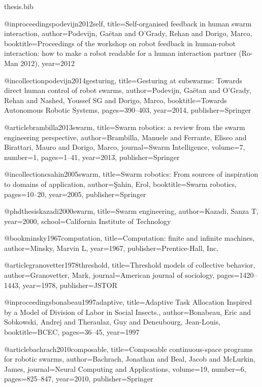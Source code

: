 \documentclass[oneside, a4paper, 12pt]{memoir}
\begin{document}
\begin{filecontents}{thesis.bib}

@inproceedings{podevijn2012self,
  title={Self-organised feedback in human swarm interaction},
  author={Podevijn, Ga{\"e}tan and O’Grady, Rehan and Dorigo, Marco},
  booktitle={Proceedings of the workshop on robot feedback in human-robot interaction: how to make a robot readable for a human interaction partner (Ro-Man 2012)},
  year={2012}
}

@incollection{podevijn2014gesturing,
  title={Gesturing at subswarms: Towards direct human control of robot swarms},
  author={Podevijn, Ga{\"e}tan and O’Grady, Rehan and Nashed, Youssef SG and Dorigo, Marco},
  booktitle={Towards Autonomous Robotic Systems},
  pages={390--403},
  year={2014},
  publisher={Springer}
}

@article{brambilla2013swarm,
  title={Swarm robotics: a review from the swarm engineering perspective},
  author={Brambilla, Manuele and Ferrante, Eliseo and Birattari, Mauro and Dorigo, Marco},
  journal={Swarm Intelligence},
  volume={7},
  number={1},
  pages={1--41},
  year={2013},
  publisher={Springer}
}

@incollection{csahin2005swarm,
  title={Swarm robotics: From sources of inspiration to domains of application},
  author={{\c{S}}ahin, Erol},
  booktitle={Swarm robotics},
  pages={10--20},
  year={2005},
  publisher={Springer}
}

@phdthesis{kazadi2000swarm,
  title={Swarm engineering},
  author={Kazadi, Sanza T},
  year={2000},
  school={California Institute of Technology}
}

@book{minsky1967computation,
  title={Computation: finite and infinite machines},
  author={Minsky, Marvin L},
  year={1967},
  publisher={Prentice-Hall, Inc.}
}

@article{granovetter1978threshold,
  title={Threshold models of collective behavior},
  author={Granovetter, Mark},
  journal={American journal of sociology},
  pages={1420--1443},
  year={1978},
  publisher={JSTOR}
}

@inproceedings{bonabeau1997adaptive,
  title={Adaptive Task Allocation Inspired by a Model of Division of Labor in Social Insects.},
  author={Bonabeau, Eric and Sobkowski, Andrej and Theraulaz, Guy and Deneubourg, Jean-Louis},
  booktitle={BCEC},
  pages={36--45},
  year={1997}
}

@article{bachrach2010composable,
  title={Composable continuous-space programs for robotic swarms},
  author={Bachrach, Jonathan and Beal, Jacob and McLurkin, James},
  journal={Neural Computing and Applications},
  volume={19},
  number={6},
  pages={825--847},
  year={2010},
  publisher={Springer}
}


\end{filecontents}
\end{document}
